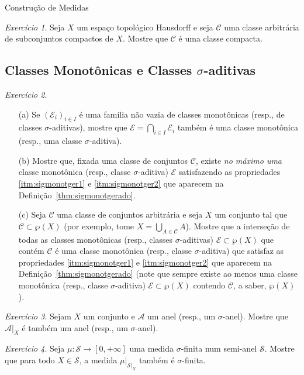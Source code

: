 \documentclass[oneside,final,11pt]{amsbook}
\theoremstyle{remark}\newtheorem{exercise}{Exercício}[chapter]
\theoremstyle{remark}\newtheorem{*exercise}[exercise]{\hbox to 0pt{\hskip 0pt minus 1fil*}Exercício}
\theoremstyle{definition}\newtheorem{exdefin}{Definição}[chapter]
\theoremstyle{plain}\newtheorem{teo}{Teorema}[section]
\theoremstyle{plain}\newtheorem{lem}[teo]{Lema}
\theoremstyle{plain}\newtheorem{prop}[teo]{Proposição}
\theoremstyle{plain}\newtheorem{cor}[teo]{Corolário}
\theoremstyle{definition}\newtheorem{defin}[teo]{Definição}
\theoremstyle{remark}\newtheorem{rem}[teo]{Observação}
\theoremstyle{definition}\newtheorem{notation}[teo]{Notação}
\theoremstyle{definition}\newtheorem{convention}[teo]{Convenção}
\theoremstyle{definition}\newtheorem{example}[teo]{Exemplo}
\numberwithin{section}{chapter}
\numberwithin{equation}{section}
\begin{document}
\begin{chapter}{Construção de Medidas}
\begin{exercise}
Seja $X$ um espaço topológico Hausdorff e seja $\mathcal C$ uma classe arbitrária
de subconjuntos compactos de $X$. Mostre que $\mathcal C$ é uma classe compacta.
\end{exercise}

\subsection*{Classes Monotônicas e Classes ${\sigma}$-aditivas}

\begin{exercise}\label{exe:sigmonotgerado}
\
\begin{itemize}
\item[(a)] Se $(\mathcal E_i)_{i\in I}$ é uma família não vazia de classes monotônicas (resp., de classes
$\sigma$-aditivas), mostre que $\mathcal E=\bigcap_{i\in I}\mathcal E_i$ também é uma classe monotônica
(resp., uma classe $\sigma$-aditiva).
\item[(b)] Mostre que, fixada uma classe de conjuntos $\mathcal C$, existe {\em no máximo uma\/}
classe monotônica (resp., classe $\sigma$-aditiva) $\mathcal E$ satisfazendo as propriedades \eqref{itm:sigmonotger1} e
\eqref{itm:sigmonotger2} que aparecem na Definição~\ref{thm:sigmonotgerado}.
\item[(c)] Seja $\mathcal C$ uma classe de conjuntos arbitrária e seja $X$ um conjunto tal que
$\mathcal C\subset\wp(X)$ (por exemplo, tome $X=\bigcup_{A\in\mathcal C}A$). Mostre que a interseção de todas
as classes monotônicas (resp., classes $\sigma$-aditivas) $\mathcal E\subset\wp(X)$ que contém $\mathcal C$ é uma
classe monotônica (resp., classe $\sigma$-aditiva) que satisfaz as propriedades \eqref{itm:sigmonotger1} e \eqref{itm:sigmonotger2}
que aparecem na Definição~\ref{thm:sigmonotgerado} (note que sempre existe ao menos uma classe monotônica
(resp., classe $\sigma$-aditiva) $\mathcal E\subset\wp(X)$ contendo $\mathcal C$, a saber, $\wp(X)$).
\end{itemize}
\end{exercise}

\begin{exercise}\label{exe:AvertYanel}
Sejam $X$ um conjunto e $\mathcal A$ um anel (resp., um $\sigma$-anel).
Mostre que $\mathcal A\vert_X$ é também um anel (resp., um $\sigma$-anel).
\end{exercise}

\begin{exercise}\label{exe:restrsigmafin}
Seja $\mu:\mathcal S\to[0,+\infty]$ uma medida $\sigma$-finita num semi-anel $\mathcal S$.
Mostre que para todo $X\in\mathcal S$, a medida $\mu\vert_{\mathcal S\vert_X}$
também é $\sigma$-finita.
\end{exercise}


\end{chapter}
\end{document}
